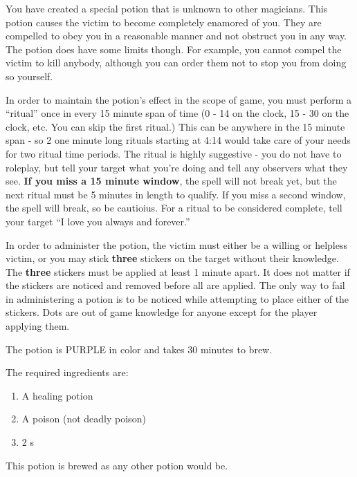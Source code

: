 \documentclass[green]{NeptuneBall}
\begin{document}
\name{\gLove{}}

You have created a special potion that is unknown to other magicians. This potion causes the victim to become completely enamored of you. They are compelled to obey you in a reasonable manner and not obstruct you in any way. The potion does have some limits though. For example, you cannot compel the victim to kill anybody, although you can order them not to stop you from doing so yourself.

In order to maintain the potion's effect in the scope of game, you must perform a ``ritual'' once in every 15 minute span of time (0 - 14 on the clock, 15 - 30 on the clock, etc. You can skip the first ritual.) This can be anywhere in the 15 minute span - so 2 one minute long rituals starting at 4:14 would take care of your needs for two ritual time periods. The ritual is highly suggestive - you do not have to roleplay, but tell your target what you're doing and tell any observers what they see. {\bf If you miss a 15 minute window}, the spell will not break yet, but the next ritual must be 5 minutes in length to qualify. If you miss a second window, the spell will break, so be cautioius. For a ritual to be considered complete, tell your target ``I love you always and forever.''

In order to administer the potion, the victim must either be a willing or helpless victim, or you may stick {\bf three} stickers on the target without their knowledge. The {\bf three} stickers must be applied at least 1 minute apart. It does not matter if the stickers are noticed and removed before all are applied. The only way to fail in administering a potion is to be noticed while attempting to place either of the stickers. Dots are out of game knowledge for anyone except for the player applying them.

The potion is PURPLE in color and takes 30 minutes to brew.

The required ingredients are:
\begin{enumerate}
\item A healing potion 
\item A poison (not deadly poison)
\item 2 \iPearl{}s
\end{enumerate}

This potion is brewed as any other potion would be.\\
\end{document}
